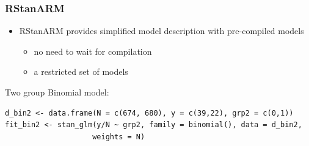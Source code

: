 \documentclass[10pt,handout]{beamer}
\begin{document}
\begin{frame}[fragile]

\frametitle{RStanARM}

  \begin{itemize}
  \item RStanARM provides simplified model description with
    pre-compiled models
    \begin{itemize}
    \item no need to wait for compilation
    \item a restricted set of models
    \end{itemize}
  \end{itemize}

Two group Binomial model:
  {\scriptsize
\begin{lstlisting}
d_bin2 <- data.frame(N = c(674, 680), y = c(39,22), grp2 = c(0,1))
fit_bin2 <- stan_glm(y/N ~ grp2, family = binomial(), data = d_bin2,
                    weights = N)
\end{lstlisting}
  }


\end{frame}
\end{document}
